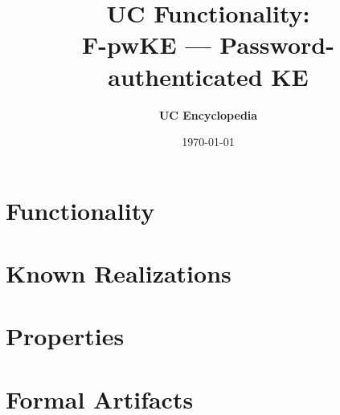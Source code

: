 \documentclass[11pt,a4paper]{article}
\title{\textbf{\Large UC Functionality:}\\[0.2em] \Large F-pwKE --- Password-authenticated KE}
\author{\textbf{UC Encyclopedia}}
\date{\today}
\newtheorem{functionality}{Functionality}
\begin{document}
\maketitle

\begin{abstract}
\end{abstract}

\section{Functionality}

%

\section{Known Realizations}


\section{Properties}


\section{Formal Artifacts}

\end{document}
